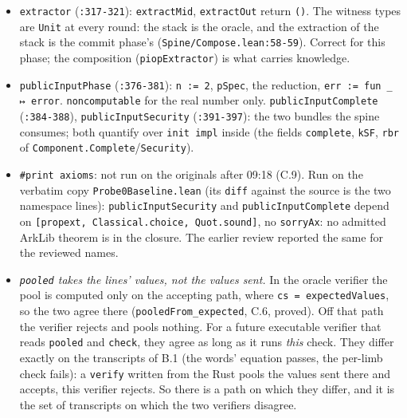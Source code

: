 \begin{itemize}
\item \texttt{extractor} (\texttt{:317-{}321}): \texttt{extractMid}, \texttt{extractOut} return \texttt{(\allowbreak{})}. The witness types are \texttt{Unit} at every round: the stack is the oracle, and the extraction of the stack is the commit phase's (\texttt{Spine/\allowbreak{}Compose.\allowbreak{}lean:58-{}59}). Correct for this phase; the composition (\texttt{piopExtractor}) is what carries knowledge.
\item \texttt{publicInputPhase} (\texttt{:376-{}381}): \texttt{n := 2}, \texttt{pSpec}, the reduction, \texttt{err := fun \_\allowbreak{} ↦ error}. \texttt{noncomputable} for the real number only. \texttt{publicInputComplete} (\texttt{:384-{}388}), \texttt{publicInputSecurity} (\texttt{:391-{}397}): the two bundles the spine consumes; both quantify over \texttt{init impl} inside (the fields \texttt{complete}, \texttt{kSF}, \texttt{rbr} of \texttt{Component.\allowbreak{}Complete}/\texttt{Security}).
\item \texttt{\#print axioms}: not run on the originals after 09:18 (C.9). Run on the verbatim copy \texttt{Probe0Baseline.\allowbreak{}lean} (its \texttt{diff} against the source is the two namespace lines): \texttt{publicInputSecurity} and \texttt{publicInputComplete} depend on \texttt{[\allowbreak{}p\allowbreak{}r\allowbreak{}o\allowbreak{}p\allowbreak{}e\allowbreak{}x\allowbreak{}t\allowbreak{},\allowbreak{} C\allowbreak{}l\allowbreak{}a\allowbreak{}s\allowbreak{}s\allowbreak{}i\allowbreak{}c\allowbreak{}a\allowbreak{}l\allowbreak{}.\allowbreak{}c\allowbreak{}h\allowbreak{}o\allowbreak{}i\allowbreak{}c\allowbreak{}e\allowbreak{},\allowbreak{} Q\allowbreak{}u\allowbreak{}o\allowbreak{}t\allowbreak{}.\allowbreak{}s\allowbreak{}o\allowbreak{}u\allowbreak{}n\allowbreak{}d\allowbreak{}]}, no \texttt{sorryAx}: no admitted ArkLib theorem is in the closure. The earlier review reported the same for the reviewed names.
\item \emph{\texttt{pooled} takes the lines' values, not the values sent.} In the oracle verifier the pool is computed only on the accepting path, where \texttt{cs = expectedValues}, so the two agree there (\texttt{pooledFrom\_\allowbreak{}expected}, C.6, proved). Off that path the verifier rejects and pools nothing. For a future executable verifier that reads \texttt{pooled} and \texttt{check}, they agree as long as it runs \emph{this} check. They differ exactly on the transcripts of B.1 (the words' equation passes, the per-limb check fails): a \texttt{verify} written from the Rust pools the values sent there and accepts, this verifier rejects. So there is a path on which they differ, and it is the set of transcripts on which the two verifiers disagree.
\end{itemize}

